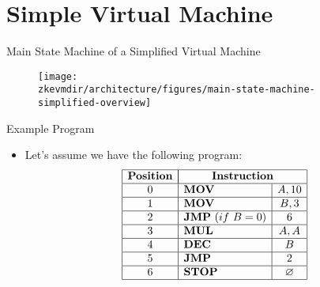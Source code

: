 
\section{Simple Virtual Machine}

\begin{frame}{Main State Machine of a Simplified Virtual Machine}
\begin{figure}
	\texttt{[image: \\zkevmdir/architecture/figures/main-state-machine-simplified-overview]}
\end{figure}
\end{frame}
















\begin{frame}{Example Program}
\begin{itemize}
\item Let's assume we have the following program:
\[
\begin{array}{|c|l|c|}
\hline
\mathbf{Position} & \multicolumn{2}{|c|}{\mathbf{Instruction}} \\ \hline
0 & \mathbf{MOV} & A, 10 \\ \hline
1 & \mathbf{MOV} & B, 3 \\ \hline
2 & \mathbf{JMP}~(if~B = 0) & 6 \\ \hline
3 & \mathbf{MUL} & A, A \\ \hline
4 & \mathbf{DEC} & B \\ \hline
5 & \mathbf{JMP} & 2 \\ \hline
6 & \mathbf{STOP} & \emptyset \\ \hline
\end{array}
\]
\end{itemize}
\end{frame}








